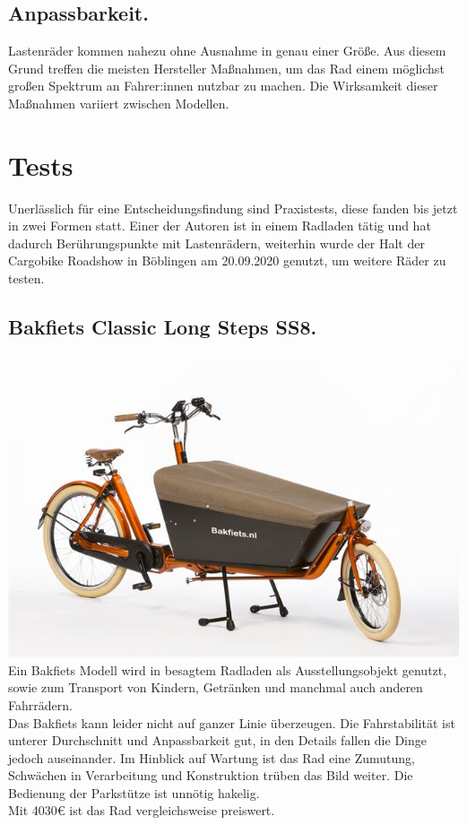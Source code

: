 \documentclass[a4paper,ngerman, 14pt] {scrartcl}
\begin{document}
\subsection{Anpassbarkeit.} Lastenräder kommen nahezu ohne Ausnahme in genau einer Größe. Aus diesem Grund treffen die meisten Hersteller Maßnahmen, um das Rad einem möglichst großen Spektrum an Fahrer:innen nutzbar zu machen. Die Wirksamkeit dieser Maßnahmen variiert zwischen Modellen.
\newpage


\section{Tests}
Unerlässlich für eine Entscheidungsfindung sind Praxistests, diese fanden bis jetzt in zwei Formen statt. Einer der Autoren ist in einem Radladen tätig und hat dadurch Berührungspunkte mit Lastenrädern, weiterhin wurde der Halt der Cargobike Roadshow in Böblingen am 20.09.2020 genutzt, um weitere Räder zu testen.

\subsection{Bakfiets Classic Long Steps SS8.}
\includegraphics[scale=0.8]{bakfiets_long_steps.jpg}\\
Ein Bakfiets Modell wird in besagtem Radladen als Ausstellungsobjekt genutzt, sowie zum Transport von Kindern, Getränken und manchmal auch anderen Fahrrädern.\\
Das Bakfiets kann leider nicht auf ganzer Linie überzeugen. Die Fahrstabilität ist unterer Durchschnitt und Anpassbarkeit gut, in den Details fallen die Dinge jedoch auseinander. Im Hinblick auf Wartung ist das Rad eine Zumutung, Schwächen in Verarbeitung und Konstruktion trüben das Bild weiter. Die Bedienung der Parkstütze ist unnötig hakelig.\\ Mit 4030€ ist das Rad vergleichsweise preiswert.
\end{document}
